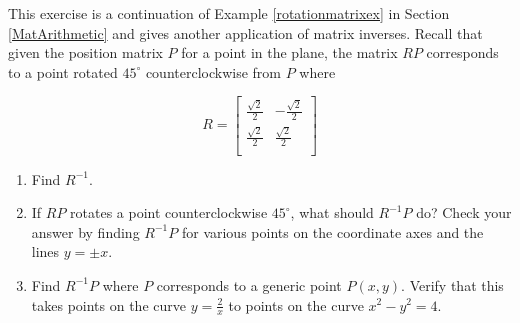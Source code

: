 \documentclass{ximera}
\begin{document}
\begin{problem}
This exercise is a continuation of Example \ref{rotationmatrixex} in Section \ref{MatArithmetic} and gives another application of matrix inverses.  Recall that given the position matrix $P$ for a point in the plane, the matrix $RP$ corresponds to a point rotated $45^{\circ}$ counterclockwise from $P$ where
 
\[R = \left[ \begin{array}{rr} \frac{\sqrt{2}}{2} & -\frac{\sqrt{2}}{2} \\[3pt] \frac{\sqrt{2}}{2} & \frac{\sqrt{2}}{2} \\ \end{array} \right]\]
 
\begin{enumerate}

\item  Find $R^{-1}$.

\item  If $RP$ rotates a point counterclockwise $45^{\circ}$, what should $R^{-1}P$ do?  Check your answer by finding $R^{-1}P$ for various points on the coordinate axes and the lines $y=\pm x$.

\item  Find $R^{-1}P$ where $P$ corresponds to a generic point $P(x,y)$. Verify that this takes points on the curve $y=\frac{2}{x}$ to points on the curve $x^2-y^2=4$.

\end{enumerate}
\end{problem} 
\end{document}
